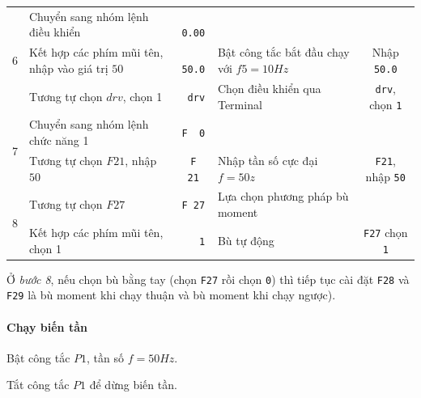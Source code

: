 \documentclass[13pt,a4paper]{extarticle}
\begin{document}
\begin{center}
\begin{longtable}{|c|p{5cm}|c|p{5cm}|c|}
\multirow{3}{.6cm}{6} & Chuyển sang nhóm lệnh điều khiển & \verb| 0.00| &  &  \\ \cline{2-5}     
  & Kết hợp các phím mũi tên, nhập vào giá trị $50$ & \verb| 50.0| & Bật công tắc bắt đầu chạy với $f5 = 10Hz$ & Nhập \verb|50.0| \\ \cline{2-5}
  & Tương tự chọn $drv$, chọn 1 & \verb| drv| & Chọn điều khiển qua Terminal &  \verb|drv|, chọn \verb|1|\\ \hline     
\multirow{2}{.6cm}{7} & Chuyển sang nhóm lệnh chức năng 1 & \verb|F  0| &  &  \\ \cline{2-5}    
  & Tương tự chọn $F21$, nhập $50$ & \verb|F  21| & Nhập tần số cực đại $f = 50z$ &  \verb|F21|, nhập \verb|50|\\ \hline  
\multirow{2}{.6cm}{8} & Tương tự  chọn $F27$& \verb|F 27| & Lựa chọn phương pháp bù moment&  \\ \cline{2-5}    
  & Kết hợp các phím mũi tên, chọn 1 & \verb|   1| & Bù tự động &\verb|F27| chọn \verb|1| \\ \hline 
\end{longtable}
\end{center}

Ở \textit{bước 8}, nếu chọn bù bằng tay (chọn \verb|F27| rồi chọn \verb|0|) thì tiếp tục cài đặt \verb|F28| và \verb|F29| là bù moment khi chạy thuận và bù moment khi chạy ngược).
\paragraph{Chạy biến tần}
\begin{list}{--}{}
\item Bật công tắc $P1$, tần số $f = 50Hz$.
\item Tắt công tắc $P1$ để dừng biến tần.
\end{list}
\end{document}
